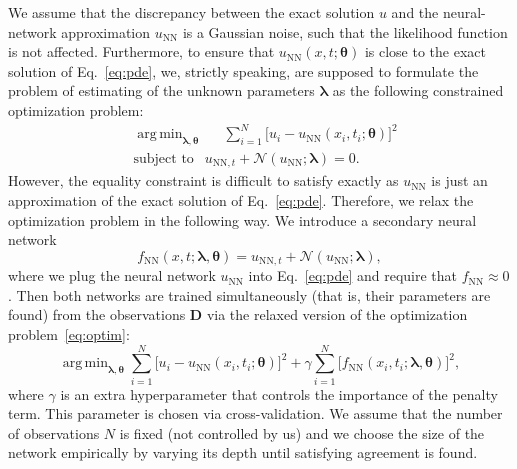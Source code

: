 \documentclass[a4paper, 12pt, parskip]{scrartcl}
\newcommand{\Data}{\vec{D}}
\renewcommand{\vec}[1]{\boldsymbol{#1}}
\newcommand{\VTheta}{\ensuremath{\vec{\theta}}}
\newcommand{\VLambda}{\ensuremath{\vec{\lambda}}}
\DeclareMathOperator*{\argmin}{arg\,min}
\newcommand{\UNN}[1][\text{NN}]{u_{#1}}
\newcommand{\FNN}[1][\text{NN}]{f_{#1}}
\newcommand{\NonlinOp}{\mathcal N\!}
\begin{document}
We assume that the discrepancy between the exact solution $u$ and the
neural-network approximation $\UNN$ is a Gaussian noise, such that the
likelihood function is not affected.
Furthermore, to ensure that $\UNN( x, t; \VTheta)$
is close to the exact solution of Eq.~\eqref{eq:pde}, we, strictly speaking,
are supposed to formulate the problem of estimating of the unknown parameters
$\VLambda$ as the following constrained optimization problem:
\begin{subequations}
\label{eq:optim}
\begin{align}
    &\argmin_{\VLambda, \VTheta} \quad \ \ 
        \sum_{i=1}^N \big[u_i - \UNN(x_i, t_i; \VTheta)\big]^2  \\
    &\text{subject to } \ \ \UNN[\text{NN}, t]  + \NonlinOp(\UNN; \VLambda) = 0.
\end{align}
\end{subequations}
However, the equality constraint is difficult to satisfy exactly as
$u_{\text{NN}}$ is just an approximation of the exact solution of
Eq.~\eqref{eq:pde}.
Therefore, we relax the optimization problem in the following way.
We introduce a secondary neural network
\begin{equation}
    \FNN(x, t; \VLambda, \VTheta) =
        u_{\text{NN}, t} + \NonlinOp(u_{\text{NN}}; \VLambda),
\end{equation}
where we plug the neural network $\UNN$ into Eq.~\eqref{eq:pde} and
require that $\FNN \approx 0$.
Then both networks are trained simultaneously (that is, their parameters are
found) from the observations $\Data$ via the relaxed version of the optimization
problem~\eqref{eq:optim}:
\begin{equation}
    \argmin_{\VLambda, \VTheta}
    \sum_{i=1}^N \big[ u_i - \UNN(x_i, t_i; \VTheta)\big ]^2
    +\gamma \sum_{i=1}^N \big[ \FNN(x_i, t_i; \VLambda, \VTheta) \big]^2,
\end{equation}
where $\gamma$ is an extra hyperparameter that controls the importance of the
penalty term.
This parameter is chosen via cross-validation.
We assume that the number of observations $N$ is fixed (not controlled by us)
and we choose the size of the network empirically by varying its depth until
satisfying agreement is found.
\end{document}

